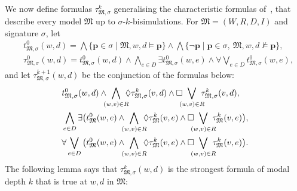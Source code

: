 \documentclass[10pt,a4paper]{amsart}
\theoremstyle{plain}
\theoremstyle{definition}
\newcommand{\fform}[1]{\boldsymbol{#1}}
\newcommand{\pvar}{\fform{p}}
\begin{document}
We now define formulas $\tau^k_{\mathfrak M,\sigma}$ generalising the characteristic formulas of~\cite{goranko20075}, that describe every model $\mathfrak{M}$ up to $\sigma$-$k$-bisimulations.
For $\mathfrak{M}=(W,R,D,I)$ and signature $\sigma$, let
%
\begin{align*}
	& t_{\mathfrak{M},\sigma}^{0}(w,d)= \bigwedge \{\pvar \in\sigma \mid \mathfrak{M},w,d\models \pvar\} \land{} 
	\bigwedge \{\neg \pvar \mid \pvar \in\sigma,\ \mathfrak{M},w,d\not\models \pvar\},\\
	& \tau_{\mathfrak{M},\sigma}^{0}(w,d)=t_{\mathfrak{M},\sigma}^{0}(w,d) \wedge{}
	\bigwedge_{e\in D} \exists t_{\mathfrak{M},\sigma}^{0}(w,e) \wedge \forall \bigvee_{e\in D} t_{\mathfrak{M},\sigma}^{0}(w,e) ,
\end{align*}
%
and let $\tau_{\mathfrak{M},\sigma}^{k+1}(w,d)$ be the conjunction of the formulas below: 
%
\begin{align*}
	& t_{\mathfrak{M},\sigma}^{0}(w,d) \wedge \hspace*{-2mm}  \bigwedge_{(w,v) \in R} \hspace*{-2mm} \Diamond \tau_{\mathfrak{M},\sigma}^{k}(v,d) \wedge \Box \hspace*{-2mm} \bigvee_{(w,v) \in R} \hspace*{-2mm}  \tau_{\mathfrak{M},\sigma}^{k}(v,d),\\
	& \bigwedge_{e\in D} \exists \big(t_{\mathfrak{M}}^{0}(w,e) \wedge \hspace*{-2mm} \bigwedge_{(w,v) \in R} \hspace*{-2mm} \Diamond \tau_{\mathfrak{M}}^{k}(v,e) \wedge 
	\Box \hspace*{-2mm} \bigvee_{(w,v) \in R} \hspace*{-2mm} \tau_{\mathfrak{M}}^{k}(v,e)\big),\\
	& \forall \bigvee_{e\in D} \big(t_{\mathfrak{M}}^{0}(w,e) \wedge \hspace*{-2mm} \bigwedge_{(w,v) \in R} \hspace*{-2mm} \Diamond \tau_{\mathfrak{M}}^{k}(v,e) \wedge 
	\Box \hspace*{-2mm} \bigvee_{(w,v) \in R} \hspace*{-2mm} \tau_{\mathfrak{M}}^{k}(v,e)\big).
\end{align*}
%
The following lemma says that $\tau^{k}_{\mathfrak{M},\sigma}(w,d)$
is the strongest formula of modal depth $k$ that is true at $w,d$ in $\mathfrak{M}$:
\end{document}
